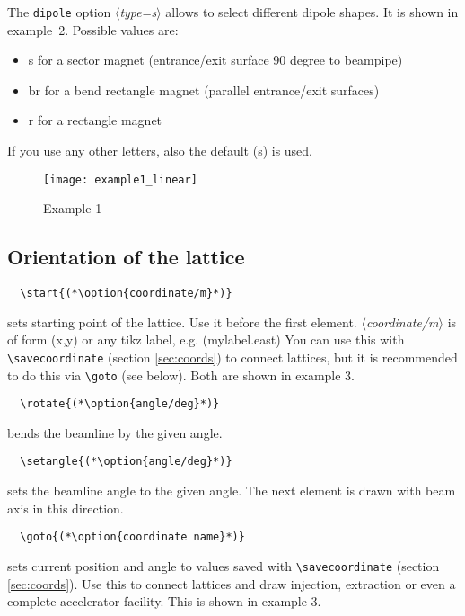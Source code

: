 \documentclass[a4paper]{scrartcl}
\newcommand{\option}[1]{{\color{blue}$\langle$\textit{#1}$\rangle$}}
\newcommand{\optiondef}[2]{{\color{green!50!black}$\langle$\textit{#1=#2}$\rangle$}}
\begin{document}
The \lstinline+dipole+ option \optiondef{type}{s} allows to select different dipole
shapes. It is shown in example~2. Possible values are:
\begin{itemize}
\item s for a sector magnet (entrance/exit surface 90 degree to beampipe)
\item br for a bend rectangle magnet (parallel entrance/exit surfaces)
\item r for a rectangle magnet
\end{itemize}
If you use any other letters, also the default (s) is used.


\begin{figure}[h]
  \centering
  \texttt{[image: example1\_linear]}
  \caption{Example 1}
  \label{fig:example1}
\end{figure}


\subsection{Orientation of the lattice}
\label{sec-5-2}

\begin{lstlisting}
  \start{(*\option{coordinate/m}*)}
\end{lstlisting}
sets starting point of the lattice. Use it before the first element. \option{coordinate/m}
is of form (x,y) or any tikz label, e.g. (mylabel.east) You can use this with
\lstinline+\savecoordinate+ (section \ref{sec:coords}) to connect lattices, but it is
recommended to do this via \lstinline+\goto+ (see below). Both are shown in example 3.

\begin{lstlisting}
  \rotate{(*\option{angle/deg}*)}
\end{lstlisting}
bends the beamline by the given angle.

\begin{lstlisting}
  \setangle{(*\option{angle/deg}*)}
\end{lstlisting}
sets the beamline angle to the given angle. The next element is drawn with beam axis in
this direction.

\begin{lstlisting}
  \goto{(*\option{coordinate name}*)}
\end{lstlisting}
sets current position and angle to values saved
with \lstinline+\savecoordinate+ (section \ref{sec:coords}).
Use this to connect lattices and draw injection, extraction or even a complete accelerator
facility. This is shown in example 3.
\end{document}
